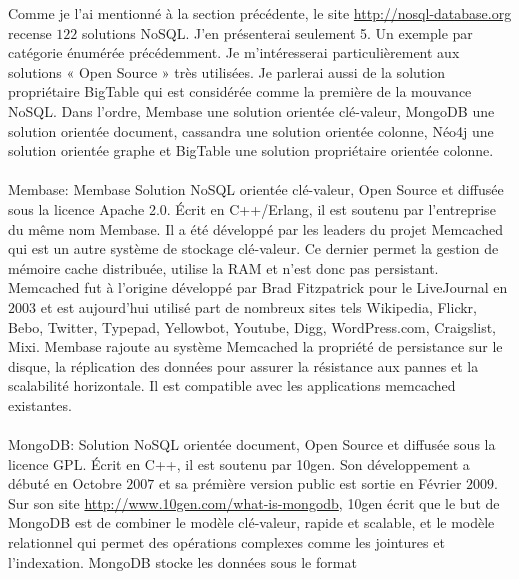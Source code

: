 Comme je l'ai mentionné à la section précédente, le
site \url{http://nosql-database.org} recense $122$
solutions \textsf{NoSQL}.  J'en présenterai seulement 5. Un exemple
par catégorie énumérée précédemment. Je m'intéresserai
particulièrement aux solutions « \textsf{Open Source} » très
utilisées. Je parlerai aussi de la solution propriétaire \textsf{BigTable}
qui est considérée comme la première de la
mouvance \textsf{NoSQL}. Dans l'ordre, \textsf{Membase} une solution
orientée \textsf{clé-valeur}, \textsf{MongoDB} une solution
orientée \textsf{document}, \textsf{cassandra} une solution
orientée \textsf{colonne}, \textsf{Néo4j} une solution
orientée \textsf{graphe} et \textsf{BigTable} une solution
propriétaire orientée \textsf{colonne}.
\\
\\
\textsf{Membase}: \label{membase}\textsf{Membase} Solution \textsf{NoSQL} orientée \textsf{clé-valeur}, Open Source et diffusée sous la licence Apache 2.0. Écrit en \textsf{C++/Erlang}, il est soutenu par l'entreprise du même nom \textsf{Membase}\cite{RickCattell}. Il a été développé par les leaders du projet \textsf{Memcached} qui est un
autre système de stockage \textsf{clé-valeur}. Ce dernier permet la
gestion de mémoire cache distribuée, utilise la \textsf{RAM} et n'est
donc pas persistant. \textsf{Memcached} fut à l'origine développé
par \textsf{Brad Fitzpatrick} pour le \textsf{LiveJournal} en $2003$
et est aujourd'hui utilisé part de nombreux sites
tels \textsf{Wikipedia, Flickr, Bebo, Twitter, Typepad, Yellowbot,
Youtube, Digg, WordPress.com, Craigslist,
Mixi}\cite{memcached}. \textsf{Membase}
rajoute au système \textsf{Memcached} la propriété de persistance sur
le disque, la réplication des données pour assurer la résistance aux
pannes et la scalabilité horizontale. Il est compatible avec les applications memcached existantes.
\\
\\ 
{\sf MongoDB}:  Solution \textsf{NoSQL} orientée \textsf{document},
Open Source et diffusée sous la licence \textsf{GPL}. Écrit
en \textsf{C++}, il est soutenu
par \textsf{10gen}\cite{RickCattell}. Son développement a débuté en Octobre $2007$ et sa prémière version public est sortie en Février $2009$\cite{blogmongodb}. Sur son
site \url{http://www.10gen.com/what-is-mongodb}, \textsf{10gen} écrit
que le but de \textsf{MongoDB} est de combiner le
modèle \textsf{clé-valeur}, rapide et scalable, et le modèle
relationnel qui permet des opérations complexes comme les jointures et
l'indexation. \textsf{MongoDB} stocke les données sous le format
